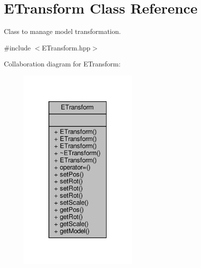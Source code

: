 \hypertarget{class_e_transform}{}\section{E\+Transform Class Reference}
\label{class_e_transform}


Class to manage model transformation.  




{\ttfamily \#include $<$E\+Transform.\+hpp$>$}



Collaboration diagram for E\+Transform\+:
\nopagebreak
\begin{figure}[H]
\begin{center}
\leavevmode
\includegraphics[width=169pt]{class_e_transform__coll__graph}
\end{center}
\end{figure}
